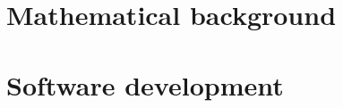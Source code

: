 \documentclass[ twoside,openright,titlepage,numbers=noenddot,headinclude,%
                footinclude=true,cleardoublepage=empty,abstractoff, %
                BCOR=5mm,paper=a4,fontsize=11pt,%
                ngerman,american,%
                ]{scrreprt}
\begin{document}
    \frenchspacing
    \raggedbottom
    \pagestyle{plain}

    
    
    \cleardoublepage
    \cleardoublepage
    \cleardoublepage
    \pagestyle{scrheadings}
    \cleardoublepage

    \cleardoublepage{}
    \cleardoublepage


	\listoftodos[To do list]
	
    \part{Mathematical background}
    
    
    
    
    
    
    \part{Software development}

    \cleardoublepage

\end{document}
